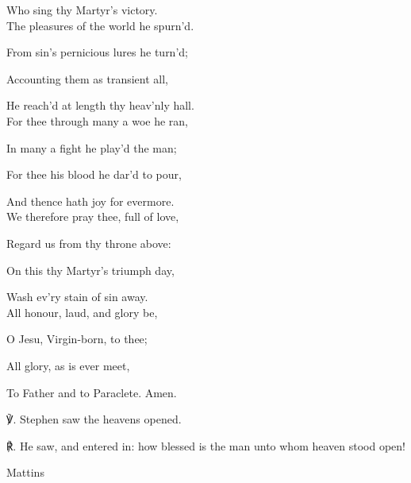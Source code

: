 \begin{paracol}{2}[]
\begin{hangparas}{1.25em}{1}
Who sing thy Martyr's victory.\\

The pleasures of the world he spurn'd.

From sin's pernicious lures he turn'd;

Accounting them as transient all,

He reach'd at length thy heav'nly hall.\\

For thee through many a woe he ran,

In many a fight he play'd the man;

For thee his blood he dar'd to pour,

And thence hath joy for evermore.\\

We therefore pray thee, full of love,

Regard us from thy throne above:

On this thy Martyr's triumph day,

Wash ev'ry stain of sin away.\\

All honour, laud, and glory be,

O Jesu, Virgin-born, to thee;

All glory, as is ever meet,

To Father and to Paraclete. Amen.\\
\end{hangparas}

℣. Stephen saw the heavens opened.

℟. He saw, and entered in: how blessed is the man unto whom heaven stood open!


\fussy
\end{paracol}


\begin{inhead}
	Mattins
\end{inhead}

